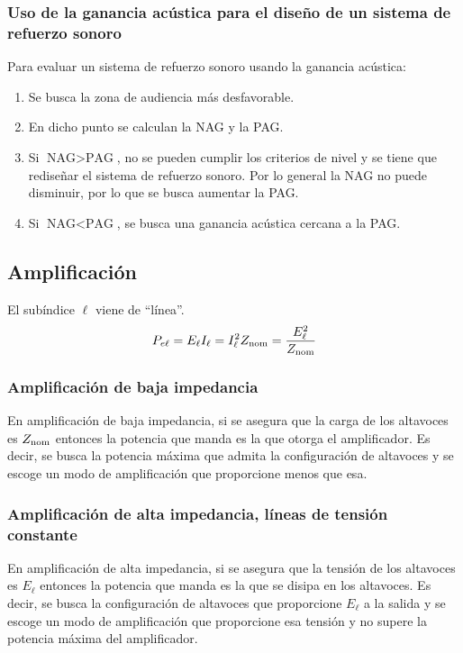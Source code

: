 \documentclass[a4paper, 8pt]{extarticle}
\begin{document}
\begin{multicols}{3}
  \subsubsection{Uso de la ganancia acústica para el diseño de un sistema de refuerzo sonoro}

  Para evaluar un sistema de refuerzo sonoro usando la ganancia acústica:
  \begin{enumerate}
    \item Se busca la zona de audiencia más desfavorable.
    \item En dicho punto se calculan la NAG y la PAG.
    \item Si $\text{NAG} > \text{PAG}$, no se pueden cumplir los criterios de nivel y se tiene que rediseñar el sistema de refuerzo sonoro. Por lo general la NAG no puede disminuir, por lo que se busca aumentar la PAG.
    \item Si $\text{NAG} < \text{PAG}$, se busca una ganancia acústica cercana a la PAG.
  \end{enumerate}

  \subsection{Amplificación}

  El subíndice $\ell$ viene de ``línea''.
  \[ P_{e\ell} = E_{\ell} I_{\ell} = I_{\ell}^2 Z _{\textnormal{nom}} = \frac{E_{\ell}^2}{Z _{\textnormal{nom}}}\]

  \subsubsection{Amplificación de baja impedancia}
  En amplificación de baja impedancia, si se asegura que la carga de los altavoces es $Z _{\textnormal{nom}}$ entonces la potencia que manda es la que otorga el amplificador. Es decir, se busca la potencia máxima que admita la configuración de altavoces y se escoge un modo de amplificación que proporcione menos que esa.
  \subsubsection{Amplificación de alta impedancia, líneas de tensión constante}
  En amplificación de alta impedancia, si se asegura que la tensión de los altavoces es $E_{\ell}$ entonces la potencia que manda es la que se disipa en los altavoces. Es decir, se busca la configuración de altavoces que proporcione $E_{\ell}$ a la salida y se escoge un modo de amplificación que proporcione esa tensión y no supere la potencia máxima del amplificador.

\end{multicols}
\end{document}
